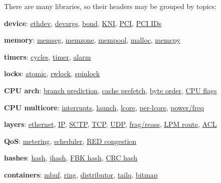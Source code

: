 There are many libraries, so their headers may be grouped by topics\+:


\begin{DoxyItemize}
\item {\bfseries device}\+: \hyperlink{rte__ethdev_8h}{ethdev}, \hyperlink{rte__devargs_8h}{devargs}, \hyperlink{rte__eth__bond_8h}{bond}, \hyperlink{rte__kni_8h}{K\+N\+I}, \hyperlink{rte__pci_8h}{P\+C\+I}, \hyperlink{rte__pci__dev__ids_8h}{P\+C\+I I\+Ds}
\item {\bfseries memory}\+: \hyperlink{rte__memory_8h}{memseg}, \hyperlink{rte__memzone_8h}{memzone}, \hyperlink{rte__mempool_8h}{mempool}, \hyperlink{rte__malloc_8h}{malloc}, \hyperlink{rte__memcpy_8h}{memcpy}
\item {\bfseries timers}\+: \hyperlink{rte__cycles_8h}{cycles}, \hyperlink{rte__timer_8h}{timer}, \hyperlink{rte__alarm_8h}{alarm}
\item {\bfseries locks}\+: \hyperlink{rte__atomic_8h}{atomic}, \hyperlink{rte__rwlock_8h}{rwlock}, \hyperlink{rte__spinlock_8h}{spinlock}
\item {\bfseries C\+P\+U arch}\+: \hyperlink{rte__branch__prediction_8h}{branch prediction}, \hyperlink{rte__prefetch_8h}{cache prefetch}, \hyperlink{rte__byteorder_8h}{byte order}, \hyperlink{rte__cpuflags_8h}{C\+P\+U flags}
\item {\bfseries C\+P\+U multicore}\+: \hyperlink{rte__interrupts_8h}{interrupts}, \hyperlink{rte__launch_8h}{launch}, \hyperlink{rte__lcore_8h}{lcore}, \hyperlink{rte__per__lcore_8h}{per-\/lcore}, \hyperlink{rte__power_8h}{power/freq}
\item {\bfseries layers}\+: \hyperlink{rte__ether_8h}{ethernet}, \hyperlink{rte__ip_8h}{I\+P}, \hyperlink{rte__sctp_8h}{S\+C\+T\+P}, \hyperlink{rte__tcp_8h}{T\+C\+P}, \hyperlink{rte__udp_8h}{U\+D\+P}, \hyperlink{rte__ip__frag_8h}{frag/reass}, \hyperlink{rte__lpm_8h}{L\+P\+M route}, \hyperlink{rte__acl_8h}{A\+C\+L}
\item {\bfseries Qo\+S}\+: \hyperlink{rte__meter_8h}{metering}, \hyperlink{rte__sched_8h}{scheduler}, \hyperlink{rte__red_8h}{R\+E\+D congestion}
\item {\bfseries hashes}\+: \hyperlink{rte__hash_8h}{hash}, \hyperlink{rte__jhash_8h}{jhash}, \hyperlink{rte__fbk__hash_8h}{F\+B\+K hash}, \hyperlink{rte__hash__crc_8h}{C\+R\+C hash}
\item {\bfseries containers}\+: \hyperlink{rte__mbuf_8h}{mbuf}, \hyperlink{rte__ring_8h}{ring}, \hyperlink{rte__distributor_8h}{distributor}, \hyperlink{rte__tailq_8h}{tailq}, \hyperlink{rte__bitmap_8h}{bitmap}

\end{DoxyItemize}
